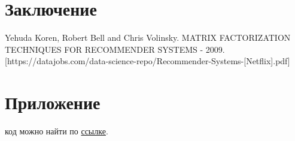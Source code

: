 \documentclass{article}
\newcommand\tab[1][1cm]{\hspace*{#1}}
\begin{document}
\section*{Заключение\vspace{5mm}}



\newpage
\renewcommand{\refname}{Список использованных источников}
\begin{thebibliography}{7}
 Yehuda Koren, Robert Bell and Chris Volinsky. MATRIX FACTORIZATION TECHNIQUES FOR RECOMMENDER SYSTEMS - 2009. [https://datajobs.com/data-science-repo/Recommender-Systems-[Netflix].pdf]
	
\end{thebibliography}


\newpage
\section*{Приложение\vspace{5mm}}
 код можно найти по \href{https://github.com/dokapoka/paper_recomm_systems}{ссылке}.

 
\end{document}
